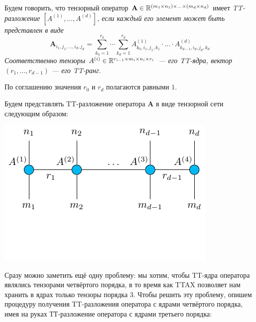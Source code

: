 \documentclass[12pt]{article}
\newcommand{\mbf}{\mathbf}
\begin{document}
    \begin{definition}
        Будем говорить, что тензорный оператор $\mbf{A} \in \RR^{(m_1 \times n_1) \times \ldots \times (m_d \times n_d)}$ имеет \it{TT-разложение}
        $\left[ A^{(1)}, \ldots, A^{(d)} \right]$, если каждый его элемент может быть представлен в виде
        \[
            \mbf{A}_{i_1, j_1, \ldots, i_d, j_d} = \sum_{k_0 = 1}^{r_0} \cdots \sum_{k_d = 1}^{r_d} A^{(1)}_{k_0, i_1, j_1, k_1} \cdot\ldots\cdot A^{(d)}_{k_{d-1}, i_d, j_d, k_d}
        \]
        Соответственно тензоры $A^{(i)} \in \mathbb{R}^{r_{i-1} \times m_i \times n_i \times r_i}$ --- его \it{TT-ядра}, вектор $(r_1, \ldots, r_{d-1})$ --- его \it{TT-ранг}.
    \end{definition}
    \begin{definition}
        По соглашению значения $r_0$ и $r_d$ полагаются равными $1$.
    \end{definition}
    Будем представлять TT-разложение оператора $\mbf{A}$ в виде тензорной сети следующим образом:
    \begin{center}
        \includegraphics[scale=1.2]{./pic/tensornet_operator}
    \end{center}
    Сразу можно заметить ещё одну проблему: мы хотим, чтобы TT-ядра оператора являлись тензорами четвёртого порядка, в то время как TTAX
    позволяет нам хранить в ядрах только тензоры порядка $3$. Чтобы решить эту проблему, опишем процедуру получения TT-разложения оператора с ядрами
    четвёртого порядка, имея на руках ТТ-разложение оператора с ядрами третьего порядка:
\end{document}
